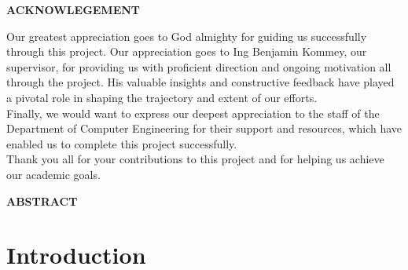 \documentclass[12pt, a4paper]{article}
\begin{document}
\begin{center}
\textbf{ACKNOWLEGEMENT}
\end{center}
Our greatest appreciation goes to God almighty for guiding us successfully through this project. Our appreciation goes to Ing Benjamin Kommey, our supervisor, for providing us with proficient direction and ongoing motivation all through the project. His valuable insights and constructive feedback have played a pivotal role in shaping the trajectory and extent of our efforts.\\
Finally, we would want to express our deepest appreciation to the staff of the Department of Computer Engineering for their support and resources, which have enabled us to complete this project successfully.\\ Thank you all for your contributions to this project and for helping us achieve our academic goals.
\newpage

\begin{center}
\textbf{ABSTRACT}
\end{center}

\newpage


\tableofcontents
\newpage
{}
\section{Introduction}
\end{document}
